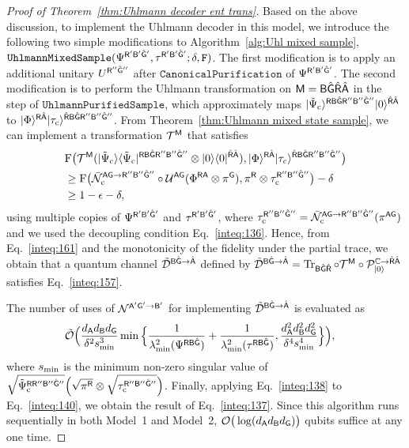 \begin{proof}[Proof of Theorem~\ref{thm:Uhlmann decoder ent trans}]
Based on the above discussion, to implement the Uhlmann decoder in this model, we introduce the following two simple modifications to
Algorithm~\ref{alg:Uhl mixed sample}, $\mathtt{UhlmannMixedSample}(\Psi^{{\mathsf{R}}'{\mathsf{B}}'\hat{{\mathsf{G}}}'}, \tau^{{\mathsf{R}}'{\mathsf{B}}'\hat{{\mathsf{G}}}'}; \delta, \mathtt{F})$.
The first modification is to apply an additional unitary $U^{{\mathsf{R}}''\hat{{\mathsf{G}}}''}$ after $\mathtt{CanonicalPurification}$ of $\Psi^{{\mathsf{R}}'{\mathsf{B}}'\hat{{\mathsf{G}}}'}$.
The second modification is to perform the Uhlmann transformation on ${\mathsf{M}} = {\mathsf{B}}\hat{{\mathsf{G}}}\hat{{\mathsf{R}}}\hat{{\mathsf{A}}}$ in the step of $\mathtt{UhlmannPurifiedSample}$, which approximately maps $|\tilde{\Psi}_{\rm c}\rangle^{{\mathsf{R}}{\mathsf{B}}\hat{{\mathsf{G}}}{\mathsf{R}}''{\mathsf{B}}''\hat{{\mathsf{G}}}''}|0\rangle^{\hat{{\mathsf{R}}}\hat{{\mathsf{A}}}}$ to $|\Phi\rangle^{{\mathsf{R}}\hat{{\mathsf{A}}}}|\tau_{\rm c}\rangle^{\hat{{\mathsf{R}}}{\mathsf{B}}\hat{{\mathsf{G}}}{\mathsf{R}}''{\mathsf{B}}''\hat{{\mathsf{G}}}''}$.
From Theorem~\ref{thm:Uhlmann mixed state sample}, we can implement a transformation ${\mathcal{T}}^{\mathsf{M}}$ that satisfies 
\begin{align}
    &{\mathrm{F}}\big({\mathcal{T}}^{\mathsf{M}}(|\tilde{\Psi}_{\rm c}\rangle\langle\tilde{\Psi}_{\rm c}|^{{\mathsf{R}}{\mathsf{B}}\hat{{\mathsf{G}}}{\mathsf{R}}''{\mathsf{B}}''\hat{{\mathsf{G}}}''}\otimes|0\rangle\langle0|^{\hat{{\mathsf{R}}}\hat{{\mathsf{A}}}}), |\Phi\rangle^{{\mathsf{R}}\hat{{\mathsf{A}}}}|\tau_{\rm c}\rangle^{\hat{{\mathsf{R}}}{\mathsf{B}}\hat{{\mathsf{G}}}{\mathsf{R}}''{\mathsf{B}}''\hat{{\mathsf{G}}}''}\big) \notag\\
    &\geq {\mathrm{F}}\big(\bar{{\mathcal{N}}}_{\rm c}^{{\mathsf{A}}{\mathsf{G}}\rightarrow{\mathsf{R}}''{\mathsf{B}}''\hat{{\mathsf{G}}}''}\circ{\mathcal{U}}^{{\mathsf{A}}{\mathsf{G}}}(\Phi^{{\mathsf{R}}{\mathsf{A}}} \otimes \pi^{\mathsf{G}}), \pi^{\mathsf{R}}\otimes \tau_{\rm c}^{{\mathsf{R}}''{\mathsf{B}}''\hat{{\mathsf{G}}}''}\big) - \delta\\
    \label{inteq:161}
    &\geq 1 -\epsilon -\delta,
\end{align}
using multiple copies of $\Psi^{{\mathsf{R}}'{\mathsf{B}}'\hat{{\mathsf{G}}}'}$ and $\tau^{{\mathsf{R}}'{\mathsf{B}}'\hat{{\mathsf{G}}}'}$, where $\tau_{\rm c}^{{\mathsf{R}}''{\mathsf{B}}''\hat{{\mathsf{G}}}''} = \bar{{\mathcal{N}}}_{\rm c}^{{\mathsf{A}}{\mathsf{G}}\rightarrow{\mathsf{R}}''{\mathsf{B}}''\hat{{\mathsf{G}}}''}(\pi^{{\mathsf{A}}{\mathsf{G}}})$ and we used the decoupling condition Eq.~\eqref{inteq:136}.
Hence, from Eq.~\eqref{inteq:161} and the monotonicity of the fidelity under the partial trace, we obtain that a quantum channel $\tilde{{\mathcal{D}}}^{{\mathsf{B}}\hat{{\mathsf{G}}}\rightarrow\hat{{\mathsf{A}}}}$ defined by $\tilde{{\mathcal{D}}}^{{\mathsf{B}}\hat{{\mathsf{G}}} \rightarrow \hat{{\mathsf{A}}}} = \operatorname{Tr}_{{\mathsf{B}}\hat{{\mathsf{G}}}\hat{{\mathsf{R}}}} \circ {\mathcal{T}}^{\mathsf{M}} \circ {\mathcal{P}}_{|0\rangle}^{\mathbb{C}\rightarrow\hat{{\mathsf{R}}}\hat{{\mathsf{A}}}}$ satisfies Eq.~\eqref{inteq:157}.



The number of uses of ${\mathcal{N}}^{{\mathsf{A}}'{\mathsf{G}}'\rightarrow{\mathsf{B}}'}$ for implementing $\tilde{{\mathcal{D}}}^{{\mathsf{B}}\hat{{\mathsf{G}}}\rightarrow\hat{{\mathsf{A}}}}$ is evaluated as
\begin{align}
\label{inteq:140}
    &\tilde{{\mathcal{O}}}\Big(\frac{d_{\mathsf{A}} d_{\mathsf{B}} d_{\mathsf{G}}}{\delta^2 s_{\rm min}^3} \min\Big\{\frac{1}{\lambda_{\rm min}^2(\Psi^{{\mathsf{R}}{\mathsf{B}}\hat{{\mathsf{G}}}})} + \frac{1}{\lambda_{\rm min}^2(\tau^{{\mathsf{R}}{\mathsf{B}}\hat{{\mathsf{G}}}})}, \frac{d_{\mathsf{A}}^2 d_{\mathsf{B}}^2 d_{\mathsf{G}}^2}{\delta^4 s_{\rm min}^4}\Big\}\Big),
\end{align}
where $s_{\rm min}$ is the minimum non-zero singular value of $\sqrt{\tilde{\Psi}_{\rm c}^{{\mathsf{R}}{\mathsf{R}}''{\mathsf{B}}''\hat{{\mathsf{G}}}''}}\Big(\sqrt{\pi^{\mathsf{R}}}\otimes\sqrt{\tau_{\rm c}^{{\mathsf{R}}''{\mathsf{B}}''\hat{{\mathsf{G}}}''}}\Big)$.
Finally, applying Eq.~\eqref{inteq:138} to Eq.~\eqref{inteq:140}, we obtain the result of Eq.~\eqref{inteq:137}.
Since this algorithm runs sequentially in both Model~1 and Model~2, ${\mathcal{O}}\big(\log(d_{\mathsf{A}} d_{\mathsf{B}} d_{\mathsf{G}})\big)$ qubits suffice at any one time.





\end{proof}
